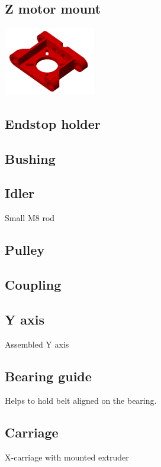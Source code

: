 \documentclass[11pt]{article}
\begin{document}
\hypertarget{thing_z-motor-mount}{\subsection{Z motor mount}}
\includegraphics[width=4cm]{images/z-motor-mount.png}

\hypertarget{thing_endstop-holder}{\subsection{Endstop holder}}

\hypertarget{thing_bushing}{\subsection{Bushing}}

\hypertarget{thing_idler-m8-piece}{\subsection{Idler}}
Small M8 rod

\hypertarget{thing_pulley}{\subsection{Pulley}}

\hypertarget{thing_coupling}{\subsection{Coupling}}

\hypertarget{thing_y-axis}{\subsection{Y axis}}
Assembled Y axis

\hypertarget{thing_bearing-guide}{\subsection{Bearing guide}}
Helps to hold belt aligned on the bearing.

\hypertarget{thing_carriage}{\subsection{Carriage}}
X-carriage with mounted extruder
\end{document}
